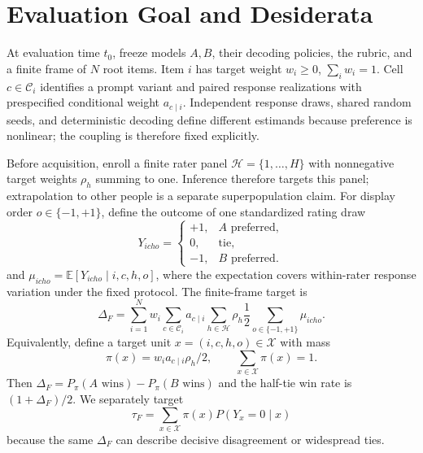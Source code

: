\documentclass{article}
\begin{document}
\section{Evaluation Goal and Desiderata}
\label{sec:goal}

At evaluation time $t_0$, freeze models $A,B$, their decoding policies, the
rubric, and a finite frame of $N$ root items. Item $i$ has target weight
$w_i\ge0$, $\sum_iw_i=1$. Cell $c\in\mathcal C_i$ identifies a prompt variant
and paired response realizations with prespecified conditional weight
$a_{c\mid i}$. Independent response draws, shared random seeds, and
deterministic decoding define different estimands because preference is
nonlinear; the coupling is therefore fixed explicitly.

Before acquisition, enroll a finite rater panel
$\mathcal H=\{1,\ldots,H\}$ with nonnegative target weights $\rho_h$ summing to
one. Inference therefore targets this panel; extrapolation to other people is a
separate superpopulation claim. For display order $o\in\{-1,+1\}$, define the
outcome of one standardized rating draw
\begin{equation}
Y_{icho}=
\begin{cases}
+1,&A\text{ preferred},\\
0,&\text{tie},\\
-1,&B\text{ preferred}.
\end{cases}
\end{equation}
and $\mu_{icho}=\mathbb E[Y_{icho}\mid i,c,h,o]$, where the expectation covers
within-rater response variation under the fixed protocol.
The finite-frame target is
\begin{equation}
\Delta_F=\sum_{i=1}^Nw_i\sum_{c\in\mathcal C_i}a_{c\mid i}
\sum_{h\in\mathcal H}\rho_h\frac12\sum_{o\in\{-1,+1\}}\mu_{icho}.
\label{eq:estimand}
\end{equation}
Equivalently, define a target unit $x=(i,c,h,o)\in\mathcal X$ with mass
\begin{equation}
\pi(x)=w_i a_{c\mid i}\rho_h/2,\qquad \sum_{x\in\mathcal X}\pi(x)=1.
\label{eq:target-mass}
\end{equation}
Then $\Delta_F=P_\pi(A\text{ wins})-P_\pi(B\text{ wins})$ and the half-tie win
rate is $(1+\Delta_F)/2$. We separately target
\begin{equation}
\tau_F=\sum_{x\in\mathcal X}\pi(x)P(Y_x=0\mid x)
\end{equation}
because the same $\Delta_F$ can describe decisive disagreement or widespread
ties.
\end{document}
